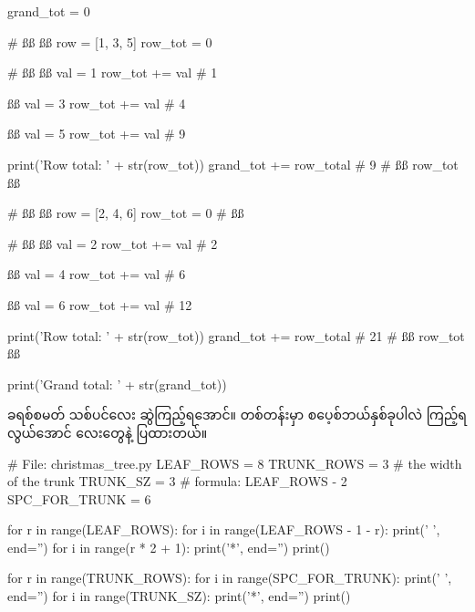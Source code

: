 %
\begin{py}
grand_tot = 0

    # ßß
    ßß
    row = [1, 3, 5]
    row_tot = 0

        # ßß
        ßß
        val = 1
        row_tot += val          # 1

        ßß
        val = 3
        row_tot += val          # 4

        ßß
        val = 5
        row_tot += val          # 9

    print('Row total: ' + str(row_tot))
    grand_tot += row_total  # 9
    # ßß row_tot ßß

    # ßß
    ßß
    row = [2, 4, 6]
    row_tot = 0 # ßß

        # ßß
        ßß
        val = 2
        row_tot += val          # 2

        ßß
        val = 4
        row_tot += val          # 6
        
        ßß
        val = 6
        row_tot += val          # 12

    print('Row total: ' + str(row_tot))
    grand_tot += row_total  # 21
    # ßß row_tot ßß

print('Grand total: ' + str(grand_tot))
\end{py}
%

ခရစ်စမတ် သစ်ပင်လေး ဆွဲကြည့်ရအောင်။ တစ်တန်းမှာ စပေ့စ်ဘယ်နှစ်ခုပါလဲ ကြည့်ရလွယ်အောင်  လေးတွေနဲ့ ပြထားတယ်။ 

\label{lst:christmastree1}
%
\begin{py} 
# File: christmas_tree.py
LEAF_ROWS = 8
TRUNK_ROWS = 3
# the width of the trunk
TRUNK_SZ = 3
# formula: LEAF_ROWS - 2
SPC_FOR_TRUNK = 6

for r in range(LEAF_ROWS):
    for i in range(LEAF_ROWS - 1 - r):
        print(' ', end='')
    for i in range(r * 2 + 1):
        print('*', end='')
    print()

for r in range(TRUNK_ROWS):
    for i in range(SPC_FOR_TRUNK):
        print(' ', end='')
    for i in range(TRUNK_SZ):
        print('*', end='')
    print()

\end{py}
%


